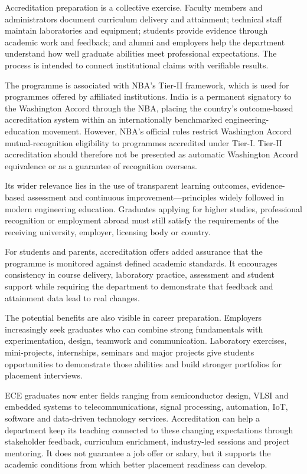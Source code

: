 {\noindent
Accreditation preparation is a collective exercise. Faculty members and administrators document curriculum delivery and attainment; technical staff maintain laboratories and equipment; students provide evidence through academic work and feedback; and alumni and employers help the department understand how well graduate abilities meet professional expectations. The process is intended to connect institutional claims with verifiable results.

\medskip
\noindent
The programme is associated with NBA's Tier-II framework, which is used for programmes offered by affiliated institutions. India is a permanent signatory to the Washington Accord through the NBA, placing the country's outcome-based accreditation system within an internationally benchmarked engineering-education movement. However, NBA's official rules restrict Washington Accord mutual-recognition eligibility to programmes accredited under Tier-I. Tier-II accreditation should therefore not be presented as automatic Washington Accord equivalence or as a guarantee of recognition overseas.

\medskip
\noindent
Its wider relevance lies in the use of transparent learning outcomes, evidence-based assessment and continuous improvement---principles widely followed in modern engineering education. Graduates applying for higher studies, professional recognition or employment abroad must still satisfy the requirements of the receiving university, employer, licensing body or country.

\noindent
For students and parents, accreditation offers added assurance that the programme is monitored against defined academic standards. It encourages consistency in course delivery, laboratory practice, assessment and student support while requiring the department to demonstrate that feedback and attainment data lead to real changes.

\medskip
\noindent
The potential benefits are also visible in career preparation. Employers increasingly seek graduates who can combine strong fundamentals with experimentation, design, teamwork and communication. Laboratory exercises, mini-projects, internships, seminars and major projects give students opportunities to demonstrate those abilities and build stronger portfolios for placement interviews.

\medskip
\noindent
ECE graduates now enter fields ranging from semiconductor design, VLSI and embedded systems to telecommunications, signal processing, automation, IoT, software and data-driven technology services. Accreditation can help a department keep its teaching connected to these changing expectations through stakeholder feedback, curriculum enrichment, industry-led sessions and project mentoring. It does not guarantee a job offer or salary, but it supports the academic conditions from which better placement readiness can develop.

}
